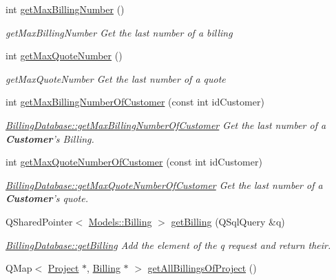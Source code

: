 \begin{DoxyCompactItemize}
int \hyperlink{classDatabases_1_1BillingDatabase_a57e4b68cac145ba400d408698312599b}{get\-Max\-Billing\-Number} ()
\begin{DoxyCompactList}\small\item\em get\-Max\-Billing\-Number Get the last number of a billing \end{DoxyCompactList}\item 
int \hyperlink{classDatabases_1_1BillingDatabase_a91704d31741279aacf9a9903b7ebcbf5}{get\-Max\-Quote\-Number} ()
\begin{DoxyCompactList}\small\item\em get\-Max\-Quote\-Number Get the last number of a quote \end{DoxyCompactList}\item 
int \hyperlink{classDatabases_1_1BillingDatabase_a78cf9a2e6d059fcf20136aa4b0b9d7ba}{get\-Max\-Billing\-Number\-Of\-Customer} (const int id\-Customer)
\begin{DoxyCompactList}\small\item\em \hyperlink{classDatabases_1_1BillingDatabase_a78cf9a2e6d059fcf20136aa4b0b9d7ba}{Billing\-Database\-::get\-Max\-Billing\-Number\-Of\-Customer} Get the last number of a {\bfseries Customer}'s Billing. \end{DoxyCompactList}\item 
int \hyperlink{classDatabases_1_1BillingDatabase_a0cbeb663b7246adb4209b2da2e691429}{get\-Max\-Quote\-Number\-Of\-Customer} (const int id\-Customer)
\begin{DoxyCompactList}\small\item\em \hyperlink{classDatabases_1_1BillingDatabase_a0cbeb663b7246adb4209b2da2e691429}{Billing\-Database\-::get\-Max\-Quote\-Number\-Of\-Customer} Get the last number of a {\bfseries Customer}'s quote. \end{DoxyCompactList}\item 
Q\-Shared\-Pointer$<$ \hyperlink{classModels_1_1Billing}{Models\-::\-Billing} $>$ \hyperlink{classDatabases_1_1BillingDatabase_a2e6c6cd8b3b040eeb7fc6ae727e85013}{get\-Billing} (Q\-Sql\-Query \&q)
\begin{DoxyCompactList}\small\item\em \hyperlink{classDatabases_1_1BillingDatabase_a835d4ca35a046fe1d0b336a1b8cf8f85}{Billing\-Database\-::get\-Billing} Add the element of the {\itshape q} request and return their. \end{DoxyCompactList}\item 
Q\-Map$<$ \hyperlink{classModels_1_1Project}{Project} $\ast$, \hyperlink{classModels_1_1Billing}{Billing} $\ast$ $>$ \hyperlink{classDatabases_1_1BillingDatabase_a44c3e09fbb7d540579f4cceae4d6901f}{get\-All\-Billings\-Of\-Project} ()

\end{DoxyCompactItemize}
